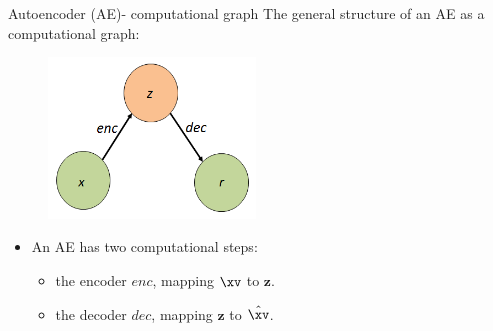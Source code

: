 \begin{vbframe}{Autoencoder (AE)- computational graph}
  The general structure of an AE as a computational graph:
  \begin{figure}
    \centering
    \includegraphics[width=5.5cm]{plots/autoencoder_basic_structure.png}
  \end{figure}
  \begin{itemize}
    \item An AE has two computational steps:
    \begin{itemize}
      \item the encoder $enc$, mapping $\xv$ to $\mathbf{z}$.
      \item the decoder $dec$, mapping $\mathbf{z}$ to $\hat\xv$.
    \end{itemize}
  \end{itemize}
\end{vbframe}
%
%
